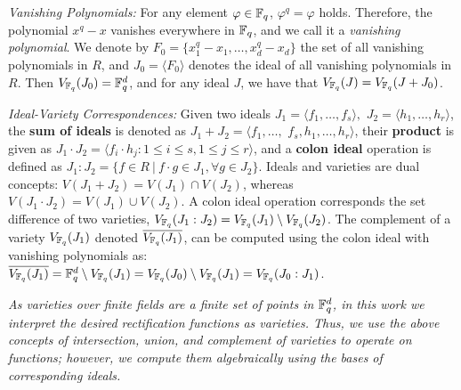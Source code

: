 

{\it Vanishing Polynomials:} For any element $\varphi\in{\mathbb{F}}_{q}$, $\varphi^q=\varphi$ holds. Therefore,
the polynomial $x^q-x$ vanishes everywhere in ${\mathbb{F}}_{q}$, and we call it a
{\it vanishing polynomial}. We denote by $F_0 =
\{x_1^q-x_1,\dots,x_d^q-x_d\}$ the set of all vanishing polynomials in
$R$, and  $J_0 = \langle F_0 \rangle$ denotes the ideal of all
vanishing polynomials in $R$. Then $V_{{\mathbb{F}}_{q}}(J_0) = {\mathbb{F}}_{q}^d$, and for any
ideal $J$, we have that $V_{{\mathbb{F}}_{q}}(J)=V_{{\mathbb{F}}_{q}}(J+J_0)$.

{\it Ideal-Variety Correspondences:} Given two ideals $J_1 = \langle
f_1,\dots,f_s\rangle,$ $J_2=\langle h_1,\dots,h_r\rangle$, the {\bf
  sum of ideals} is denoted as $J_1 + J_2 = \langle
f_1,\dots,$ $f_s,h_1,\dots,h_r\rangle$, their {\bf product} is
given as $J_1\cdot J_2 = \langle f_i\cdot h_j: 1\leq i\leq s, 1\leq
j\leq r\rangle$, and a {\bf colon ideal} operation is defined as
$J_1:J_2 = \{f \in R\ |\ f\cdot g \in J_1, \forall g \in J_2\}$. 
Ideals and varieties are dual concepts:
$V(J_1 + J_2) = V(J_1) \cap V(J_2)$, whereas $V(J_1\cdot J_2) = V(J_1)
\cup V(J_2)$. A colon ideal operation corresponds the set difference of 
two varieties, $V_{{\mathbb{F}}_{q}}(J_1:J_2)=V_{{\mathbb{F}}_{q}}(J_1)
\setminus V_{{\mathbb{F}}_{q}}(J_2)$. 
The complement of a variety $V_{{\mathbb{F}}_{q}}(J_1)$ denoted $\overline{V_{{\mathbb{F}}_{q}}(J_1)}$, 
can be computed using the colon ideal with vanishing polynomials 
as: $\overline{V_{{\mathbb{F}}_{q}}(J_1)} = {\mathbb{F}}_{q}^d \setminus
V_{{\mathbb{F}}_{q}}(J_1) = V_{{\mathbb{F}}_{q}}(J_0) \setminus V_{{\mathbb{F}}_{q}}(J_1) = V_{{\mathbb{F}}_{q}}(J_0:J_1)$.

{\it As varieties over finite fields are a finite set of points in ${\mathbb{F}}_{q}^d$,
in this work we interpret the desired rectification functions as
varieties. Thus, we use the above concepts of intersection, union, and
complement of varieties to operate on functions; however, we compute
them algebraically using the \Grobner bases of corresponding ideals.}

